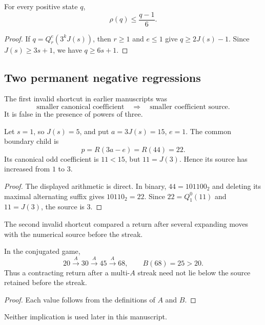 \begin{lemma}\label{lem:source-bound}
For every positive state $q$,
\[
  \rho(q)\le\frac{q-1}{6}.
\]
\end{lemma}

\begin{proof}
If $q=Q_r^e(3^k J(s))$, then $r\ge1$ and $e\le1$ give
$q\ge2J(s)-1$.  Since $J(s)\ge3s+1$, we have $q\ge6s+1$.
\end{proof}

\subsection{Two permanent negative regressions}

The first invalid shortcut in earlier manuscripts was
\[
 \text{smaller canonical coefficient}
 \quad\Longrightarrow\quad
 \text{smaller coefficient source}.
\]
It is false in the presence of powers of three.

\begin{proposition}\label{prop:coeff-source-counter}
Let $s=1$, so $J(s)=5$, and put $a=3J(s)=15$, $e=1$.  The common boundary
child is
\[
 p=R(3a-e)=R(44)=22.
\]
Its canonical odd coefficient is $11<15$, but $11=J(3)$.  Hence its source
has increased from $1$ to $3$.
\end{proposition}

\begin{proof}
The displayed arithmetic is direct.  In binary, $44=101100_2$ and deleting
its maximal alternating suffix gives $10110_2=22$.  Since
$22=Q_1^0(11)$ and $11=J(3)$, the source is $3$.
\end{proof}

The second invalid shortcut compared a return after several expanding moves
with the numerical source before the streak.

\begin{proposition}\label{prop:prestreak}
In the conjugated game,
\[
  20\xrightarrow{A}30\xrightarrow{A}45\xrightarrow{A}68,
  \qquad B(68)=25>20.
\]
Thus a contracting return after a multi-$A$ streak need not lie below the
source retained before the streak.
\end{proposition}

\begin{proof}
Each value follows from the definitions of $A$ and $B$.
\end{proof}

Neither implication is used later in this manuscript.

